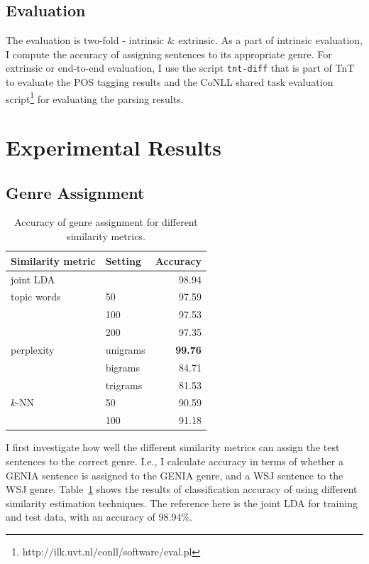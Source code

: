 \subsection{Evaluation}

The evaluation is two-fold - intrinsic \& extrinsic. As a part of intrinsic evaluation, I compute the accuracy of assigning sentences to its appropriate genre. For extrinsic or end-to-end evaluation, I use the script \texttt{tnt-diff} that is part of TnT to evaluate the POS tagging results  and the CoNLL shared task evaluation script\footnote{http://ilk.uvt.nl/conll/software/eval.pl} for evaluating the parsing results.


\section{Experimental Results} \label{exptres}

\subsection{Genre Assignment}

\begin{table}[t!]
\centering
\begin{tabular}{l|l|r|}
Similarity metric & Setting & Accuracy \\ \hline
joint LDA & & 98.94 \\ \hline
topic words & 50 & 97.59 \\ 
 & 100 & 97.53 \\ 
 & 200 & 97.35 \\ \hline
perplexity & unigrams & \textbf{99.76} \\ 
 & bigrams & 84.71 \\  
 & trigrams & 81.53 \\ \hline
$k$-NN & 50 & 90.59 \\ 
 & 100 & 91.18 \\ \hline
\end{tabular}
\caption{Accuracy of genre assignment for different similarity metrics.}
\label{tab:acc:class:simmetr}
\end{table}

I first investigate how well the different similarity metrics can assign the test sentences to the correct genre. I.e., I calculate accuracy in terms of whether a GENIA sentence is assigned to the GENIA genre, and a WSJ sentence to the WSJ genre.
Table~\ref{tab:acc:class:simmetr} shows the results of classification accuracy of using different similarity estimation techniques. The reference here is the joint LDA for training and test data, with an accuracy of 98.94\%. 
 
